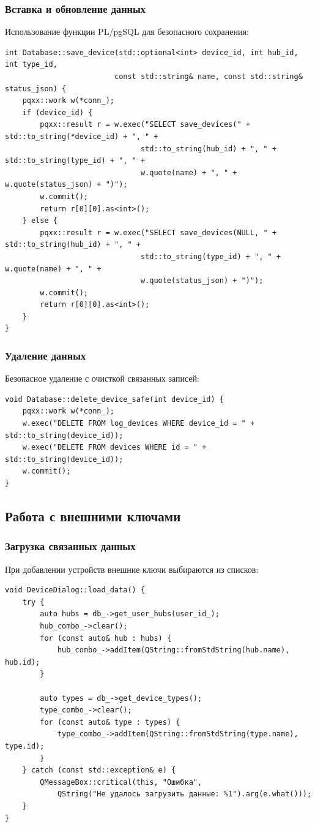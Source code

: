 \documentclass[oneside,a4paper,14pt]{extarticle}
\begin{document}
\subsubsection*{Вставка и обновление данных}
\noindent Использование функции PL/pgSQL для безопасного сохранения:

\begin{verbatim}
int Database::save_device(std::optional<int> device_id, int hub_id, int type_id,
                         const std::string& name, const std::string& status_json) {
    pqxx::work w(*conn_);
    if (device_id) {
        pqxx::result r = w.exec("SELECT save_devices(" + std::to_string(*device_id) + ", " +
                               std::to_string(hub_id) + ", " + std::to_string(type_id) + ", " +
                               w.quote(name) + ", " + w.quote(status_json) + ")");
        w.commit();
        return r[0][0].as<int>();
    } else {
        pqxx::result r = w.exec("SELECT save_devices(NULL, " + std::to_string(hub_id) + ", " +
                               std::to_string(type_id) + ", " + w.quote(name) + ", " +
                               w.quote(status_json) + ")");
        w.commit();
        return r[0][0].as<int>();
    }
}
\end{verbatim}

\subsubsection*{Удаление данных}
\noindent Безопасное удаление с очисткой связанных записей:

\begin{verbatim}
void Database::delete_device_safe(int device_id) {
    pqxx::work w(*conn_);
    w.exec("DELETE FROM log_devices WHERE device_id = " + std::to_string(device_id));
    w.exec("DELETE FROM devices WHERE id = " + std::to_string(device_id));
    w.commit();
}
\end{verbatim}

\subsection*{Работа с внешними ключами}

\subsubsection*{Загрузка связанных данных}
\noindent При добавлении устройств внешние ключи выбираются из списков:

\begin{verbatim}
void DeviceDialog::load_data() {
    try {
        auto hubs = db_->get_user_hubs(user_id_);
        hub_combo_->clear();
        for (const auto& hub : hubs) {
            hub_combo_->addItem(QString::fromStdString(hub.name), hub.id);
        }

        auto types = db_->get_device_types();
        type_combo_->clear();
        for (const auto& type : types) {
            type_combo_->addItem(QString::fromStdString(type.name), type.id);
        }
    } catch (const std::exception& e) {
        QMessageBox::critical(this, "Ошибка",
            QString("Не удалось загрузить данные: %1").arg(e.what()));
    }
}
\end{verbatim}
\end{document}
